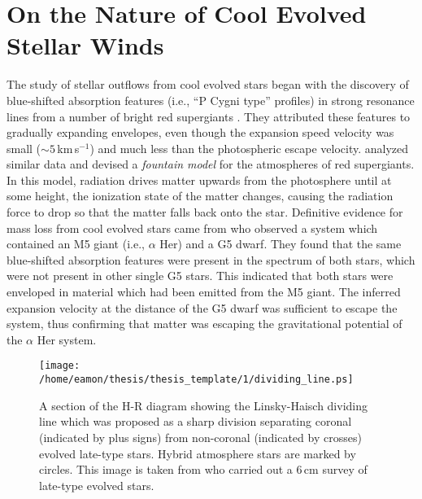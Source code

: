\section{On the Nature of Cool Evolved Stellar Winds}\label{sec:1.2}
The study of stellar outflows from cool evolved stars began with the discovery of blue-shifted absorption features (i.e., ``P Cygni type'' profiles) in strong resonance lines from a number of bright red supergiants \citep{adams_1935}. They attributed these features to gradually expanding envelopes, even though the expansion speed velocity was small ($\sim 5$\,km\,s$^{-1}$) and much less than the photospheric escape velocity. \cite{spitzer_1939} analyzed similar data and devised a \textit{fountain model} for the atmospheres of red supergiants. In this model, radiation drives matter upwards from the photosphere until at some height, the ionization state of the matter changes, causing the radiation force to drop so that the matter falls back onto the star. Definitive evidence for mass loss from cool evolved stars came from \cite{deutsch_1956} who observed a system which contained an M5 giant (i.e., $\alpha$ Her) and a G5 dwarf. They found that the same blue-shifted absorption features were present in the spectrum of both stars, which were not present in other single G5 stars. This indicated that both stars were enveloped in material which had been emitted from the M5 giant. The inferred expansion velocity at the distance of the G5 dwarf was sufficient to escape the system, thus confirming that matter was escaping the gravitational potential of the $\alpha$ Her system.

\begin{figure}[hbt!]
\centering 
          \texttt{[image: /home/eamon/thesis/thesis\_template/1/dividing\_line.ps]}
\caption[The Linsky-Haisch dividing line.]{A section of the H-R diagram showing the Linsky-Haisch dividing line which was proposed as a sharp division separating coronal (indicated by plus signs) from non-coronal (indicated by crosses) evolved late-type stars. Hybrid atmosphere stars are marked by circles. This image is taken from \cite{drake_1986} who carried out a 6\,cm survey of late-type evolved stars.}
\label{fig:1.2.1}
\end{figure}

